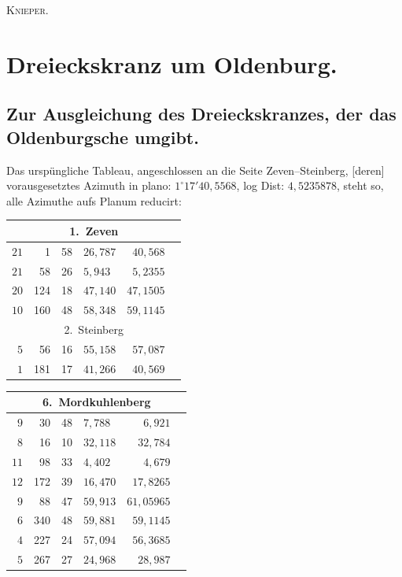 \documentclass[12pt,a4paper]{article}
\theoremstyle{plain}
\theoremstyle{definition}
\theoremstyle{remark}
\begin{document}
\hfill\textsc{Knieper.}

\newpage
\section*{Dreieckskranz um Oldenburg.}
\label{sec:oldenburg}

\subsection*{Zur Ausgleichung des Dreieckskranzes, der das Oldenburgsche umgibt.}
\label{subsec:oldenburg-ausgl}

Das ursp\"ungliche Tableau, angeschlossen an die Seite Zeven--Steinberg, [deren] vorausgesetztes Azimuth in plano: $1^{\circ}17'40{,}5568$, log Dist: $4{,}5235878$, steht so, alle Azimuthe aufs Planum reducirt:

\small
\begin{center}
\begin{tabular}{r|r@{${}^{\circ}$}r@{${}'$}l|r@{${}'$}l}
\multicolumn{6}{c}{1.\ Zeven}\\
\hline
$21$ & 1 & 58 & $26{,}787$ & $40{,}568$\\
$21$ & 58 & 26 & $5{,}943$ & $5{,}2355$\\
$20$ & 124 & 18 & $47{,}140$ & $47{,}1505$\\
$10$ & 160 & 48 & $58{,}348$ & $59{,}1145$\\
\multicolumn{6}{c}{2.\ Steinberg}\\
\hline
$5$ & 56 & 16 & $55{,}158$ & $57{,}087$\\
$1$ & 181 & 17 & $41{,}266$ & $40{,}569$
\end{tabular}
\quad
\begin{tabular}{r|r@{${}^{\circ}$}r@{${}'$}l|r@{${}'$}l}
\multicolumn{6}{c}{6.\ Mordkuhlenberg}\\
\hline
$9$ & 30 & 48 & $7{,}788$ & $6{,}921$\\
$8$ & 16 & 10 & $32{,}118$ & $32{,}784$\\
$11$ & 98 & 33 & $4{,}402$ & $4{,}679$\\
$12$ & 172 & 39 & $16{,}470$ & $17{,}8265$\\
$9$ & 88 & 47 & $59{,}913$ & $61{,}05965$\\
$6$ & 340 & 48 & $59{,}881$ & $59{,}1145$\\
$4$ & 227 & 24 & $57{,}094$ & $56{,}3685$\\
$5$ & 267 & 27 & $24{,}968$ & $28{,}987$
\end{tabular}
\end{center}
\normalsize
\end{document}
